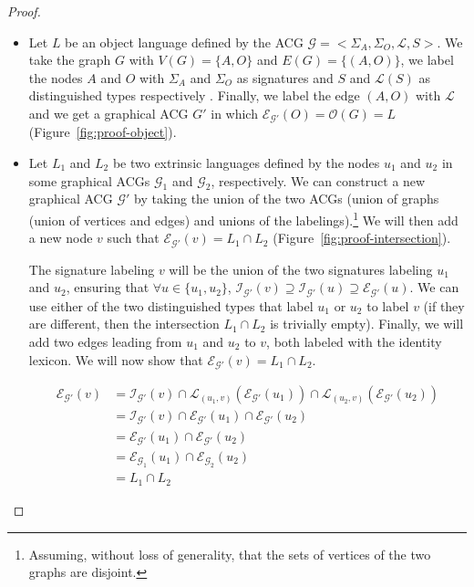 \begin{proof}
  \begin{itemize}
    \item Let $L$ be an object language defined by the ACG $\mathcal{G}
      = \mathopen{<} \Sigma_A, \Sigma_O, \mathcal{L},
      S\mathclose{>}$. We take the graph $G$ with $V(G) = \{A, O\}$ and
      $E(G) = \{(A,O)\}$, we label the nodes $A$ and $O$ with $\Sigma_A$
      and $\Sigma_O$ as signatures and $S$ and $\mathcal{L}(S)$ as
      distinguished types respectively . Finally, we label the edge
      $(A,O)$ with $\mathcal{L}$ and we get a graphical ACG $G'$ in
      which $\mathcal{E}_{\mathcal{G'}}(O) = \mathcal{O}(G) = L$
      (Figure~\ref{fig:proof-object}).

    \item Let $L_1$ and $L_2$ be two extrinsic languages defined by the
      nodes $u_1$ and $u_2$ in some graphical ACGs $\mathcal{G}_1$ and
      $\mathcal{G}_2$, respectively. We can construct a new graphical
      ACG $\mathcal{G}'$ by taking the union of the two ACGs (union of
      graphs (union of vertices and edges) and unions of the
      labelings).\footnote{Assuming, without loss of generality, that
        the sets of vertices of the two graphs are disjoint.} We will
      then add a new node $v$ such that $\mathcal{E}_{\mathcal{G}'}(v) =
      L_1 \cap L_2$ (Figure~\ref{fig:proof-intersection}).

      The signature labeling $v$ will be the union of the two signatures
      labeling $u_1$ and $u_2$, ensuring that $\forall u \in \{u_1,
      u_2\}$, $\mathcal{I}_{\mathcal{G}'}(v) \supseteq
      \mathcal{I}_{\mathcal{G}'}(u) \supseteq
      \mathcal{E}_{\mathcal{G}'}(u)$. We can use either of the two
      distinguished types that label $u_1$ or $u_2$ to label $v$ (if
      they are different, then the intersection $L_1 \cap L_2$ is
      trivially empty). Finally, we will add two edges leading from
      $u_1$ and $u_2$ to $v$, both labeled with the identity lexicon. We
      will now show that $\mathcal{E}_{\mathcal{G}'}(v) = L_1 \cap L_2$.

      \begin{align*}
        \mathcal{E}_{\mathcal{G}'}(v) &= \mathcal{I}_{\mathcal{G}'}(v)
        \cap \mathcal{L}_{(u_1,v)}(\mathcal{E}_{\mathcal{G}'}(u_1)) \cap
        \mathcal{L}_{(u_2,v)}(\mathcal{E}_{\mathcal{G}'}(u_2)) \\ &=
        \mathcal{I}_{\mathcal{G}'}(v) \cap
        \mathcal{E}_{\mathcal{G}'}(u_1) \cap
        \mathcal{E}_{\mathcal{G}'}(u_2) \\ &=
        \mathcal{E}_{\mathcal{G}'}(u_1) \cap
        \mathcal{E}_{\mathcal{G}'}(u_2) \\ &=
        \mathcal{E}_{\mathcal{G}_1}(u_1) \cap
        \mathcal{E}_{\mathcal{G}_2}(u_2) \\ &= L_1 \cap L_2
      \end{align*}


\end{itemize}
\end{proof}
